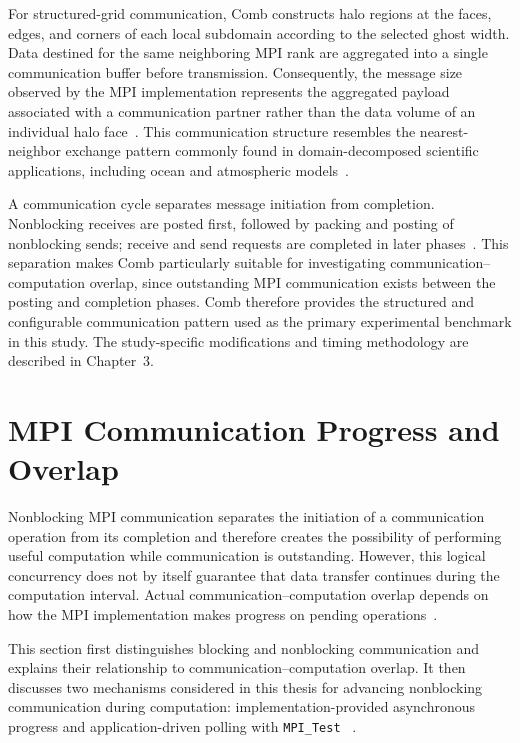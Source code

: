 For structured-grid communication, Comb constructs halo regions at the
faces, edges, and corners of each local subdomain according to the selected
ghost width. Data destined for the same neighboring MPI rank are aggregated
into a single communication buffer before transmission. Consequently, the
message size observed by the MPI implementation represents the aggregated
payload associated with a communication partner rather than the data volume
of an individual halo face~\cite[\texttt{include/CommFactory.hpp}]{combGithub}. This communication structure resembles the
nearest-neighbor exchange pattern commonly found in domain-decomposed
scientific applications, including ocean and atmospheric models~\cite{mitgcmCommunication}.

A communication cycle separates message initiation from completion.
Nonblocking receives are posted first, followed by packing and posting of
nonblocking sends; receive and send requests are completed in later phases~\cite[\texttt{include/do\_cycles.hpp}]{combGithub}.
This separation makes Comb particularly suitable for investigating
communication--computation overlap, since outstanding MPI communication
exists between the posting and completion phases. Comb therefore provides
the structured and configurable communication pattern used as the primary
experimental benchmark in this study. The study-specific modifications and
timing methodology are described in Chapter~3.

\section{MPI Communication Progress and Overlap}

Nonblocking MPI communication separates the initiation of a communication
operation from its completion and therefore creates the possibility of
performing useful computation while communication is outstanding. However,
this logical concurrency does not by itself guarantee that data transfer
continues during the computation interval. Actual communication--computation
overlap depends on how the MPI implementation makes progress on pending
operations~\cite{denis2016mpi}.

This section first distinguishes blocking and nonblocking communication and
explains their relationship to communication--computation overlap. It then
discusses two mechanisms considered in this thesis for advancing nonblocking
communication during computation: implementation-provided asynchronous progress
and application-driven polling with \texttt{MPI\_Test}
~\cite{ruhela2019async,mpi50,mpiProgressGuidelines}.


